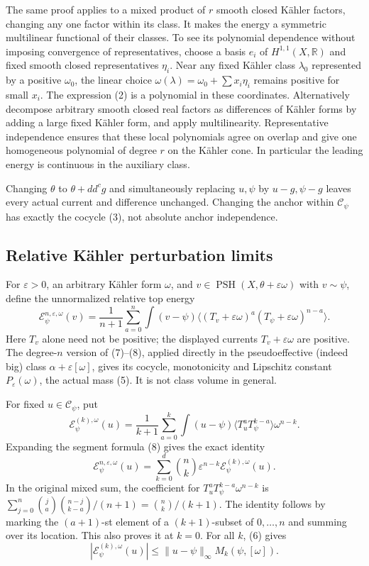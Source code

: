 \documentclass[
  11pt,
]{article}
\begin{document}
The same proof applies to a mixed product of \(r\) smooth closed Kähler
factors, changing any one factor within its class. It makes the energy a
symmetric multilinear functional of their classes. To see its polynomial
dependence without imposing convergence of representatives, choose a
basis \(e_i\) of \(H^{1,1}(X,\mathbb R)\) and fixed smooth closed
representatives \(\eta_i\). Near any fixed Kähler class \(\lambda_0\)
represented by a positive \(\omega_0\), the linear choice
\(\omega(\lambda)=\omega_0+\sum x_i\eta_i\) remains positive for small
\(x_i\). The expression (2) is a polynomial in these coordinates.
Alternatively decompose arbitrary smooth closed real factors as
differences of Kähler forms by adding a large fixed Kähler form, and
apply multilinearity. Representative independence ensures that these
local polynomials agree on overlap and give one homogeneous polynomial
of degree \(r\) on the Kähler cone. In particular the leading energy is
continuous in the auxiliary class.

Changing \(\theta\) to \(\theta+dd^cg\) and simultaneously replacing
\(u,\psi\) by \(u-g,\psi-g\) leaves every actual current and difference
unchanged. Changing the anchor within \(\mathcal C_\psi\) has exactly
the cocycle (3), not absolute anchor independence.

\subsection{Relative Kähler perturbation
limits}\label{relative-kuxe4hler-perturbation-limits}

For \(\varepsilon>0\), an arbitrary Kähler form \(\omega\), and
\(v\in\operatorname{PSH}(X,\theta+\varepsilon\omega)\) with
\(v\sim\psi\), define the unnormalized relative top energy \[
\mathcal E^{n,\varepsilon,\omega}_\psi(v)
=\frac1{n+1}\sum_{a=0}^n\int(v-\psi)
\langle(T_v+\varepsilon\omega)^a(T_\psi+\varepsilon\omega)^{n-a}\rangle.
\tag{12}
\] Here \(T_v\) alone need not be positive; the displayed currents
\(T_v+\varepsilon\omega\) are positive. The degree-\(n\) version of
(7)--(8), applied directly in the pseudoeffective (indeed big) class
\(\alpha+\varepsilon[\omega]\), gives its cocycle, monotonicity and
Lipschitz constant \(P_\varepsilon(\omega)\), the actual mass (5). It is
not class volume in general.

For fixed \(u\in\mathcal C_\psi\), put \[
\mathcal E^{(k),\omega}_\psi(u)=\frac1{k+1}\sum_{a=0}^k
\int(u-\psi)\langle T_u^aT_\psi^{k-a}\rangle\omega^{n-k}.
\] Expanding the segment formula (8) gives the exact identity \[
\mathcal E^{n,\varepsilon,\omega}_\psi(u)
=\sum_{k=0}^d\binom nk\varepsilon^{n-k}\mathcal E^{(k),\omega}_\psi(u).
\tag{13}
\] In the original mixed sum, the coefficient for
\(T_u^aT_\psi^{k-a}\omega^{n-k}\) is
\(\sum_{j=0}^n\binom ja\binom{n-j}{k-a}/(n+1)
=\binom n k/(k+1)\). The identity follows by marking the \((a+1)\)-st
element of a \((k+1)\)-subset of \({0,\ldots,n}\) and summing over its
location. This also proves it at \(k=0\). For all \(k\), (6) gives \[
|\mathcal E^{(k),\omega}_\psi(u)|\leq\|u-\psi\|_\infty M_k(\psi,[\omega]).
\tag{14}
\]
\end{document}
